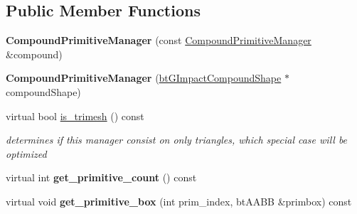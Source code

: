 \subsection*{Public Member Functions}
\begin{DoxyCompactItemize}
\item 
\hypertarget{classbt_g_impact_compound_shape_1_1_compound_primitive_manager_a5539cca68e6315d315bbc391373c5c00}{{\bfseries Compound\+Primitive\+Manager} (const \hyperlink{classbt_g_impact_compound_shape_1_1_compound_primitive_manager}{Compound\+Primitive\+Manager} \&compound)}\label{classbt_g_impact_compound_shape_1_1_compound_primitive_manager_a5539cca68e6315d315bbc391373c5c00}

\item 
\hypertarget{classbt_g_impact_compound_shape_1_1_compound_primitive_manager_a52742fa7366e3b923cfbd5fc64a3e3a7}{{\bfseries Compound\+Primitive\+Manager} (\hyperlink{classbt_g_impact_compound_shape}{bt\+G\+Impact\+Compound\+Shape} $\ast$compound\+Shape)}\label{classbt_g_impact_compound_shape_1_1_compound_primitive_manager_a52742fa7366e3b923cfbd5fc64a3e3a7}

\item 
\hypertarget{classbt_g_impact_compound_shape_1_1_compound_primitive_manager_afe172518435ae7db098a1e923f924861}{virtual bool \hyperlink{classbt_g_impact_compound_shape_1_1_compound_primitive_manager_afe172518435ae7db098a1e923f924861}{is\+\_\+trimesh} () const }\label{classbt_g_impact_compound_shape_1_1_compound_primitive_manager_afe172518435ae7db098a1e923f924861}

\begin{DoxyCompactList}\small\item\em determines if this manager consist on only triangles, which special case will be optimized \end{DoxyCompactList}\item 
\hypertarget{classbt_g_impact_compound_shape_1_1_compound_primitive_manager_af583a8c244dac7ce804c092cd3d30817}{virtual int {\bfseries get\+\_\+primitive\+\_\+count} () const }\label{classbt_g_impact_compound_shape_1_1_compound_primitive_manager_af583a8c244dac7ce804c092cd3d30817}

\item 
\hypertarget{classbt_g_impact_compound_shape_1_1_compound_primitive_manager_a2f71de04d851925a4f4c5fc6973a9c96}{virtual void {\bfseries get\+\_\+primitive\+\_\+box} (int prim\+\_\+index, bt\+A\+A\+B\+B \&primbox) const }\label{classbt_g_impact_compound_shape_1_1_compound_primitive_manager_a2f71de04d851925a4f4c5fc6973a9c96}


\end{DoxyCompactItemize}
